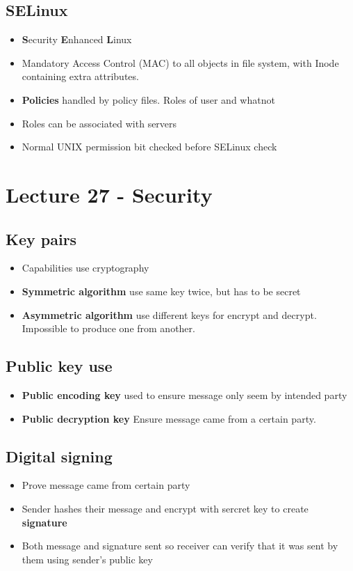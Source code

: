 \documentclass{article}
\begin{document}
	\subsection{SELinux}
		\begin{itemize}
			\item \textbf{S}ecurity \textbf{E}nhanced \textbf{L}inux
			\item Mandatory Access Control (MAC) to all objects in file system, with Inode containing extra attributes.
			\item \textbf{Policies} handled by policy files. Roles of user and whatnot
			\item Roles can be associated with servers
			\item Normal UNIX permission bit checked before SELinux check
		\end{itemize}
		
\section{Lecture 27 - Security}
	\subsection{Key pairs}
		\begin{itemize}
			\item Capabilities use cryptography
			\item \textbf{Symmetric algorithm} use same key twice, but has to be secret
			\item \textbf{Asymmetric algorithm} use different keys for encrypt and decrypt. Impossible to produce one from another.
		\end{itemize}

	\subsection{Public key use}
		\begin{itemize}
			\item \textbf{Public encoding key} used to ensure message only seem by intended party
			\item \textbf{Public decryption key} Ensure message came from a certain party.
		\end{itemize}
		
	\subsection{Digital signing}
		\begin{itemize}
			\item Prove message came from certain party
			\item Sender hashes their message and encrypt with sercret key to create \textbf{signature}
			\item Both message and signature sent so receiver can verify that it was sent by them using sender's public key
		\end{itemize}
		
\end{document}

